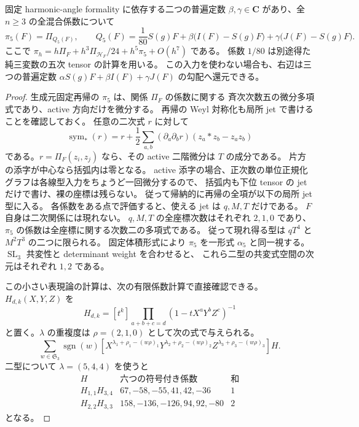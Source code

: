 \begin{proposition}[五次の混合項の二定数への還元]
\label{prop:nfm-mixed-fifth-reduction}
固定 harmonic-angle formality に依存する二つの普遍定数
$\beta,\gamma\in\mathbf C$ があり、全 $n\ge3$ の全混合係数について
\[
 \pi_5(F)=\Pi_{Q_5(F)},\qquad
 Q_5(F)=\frac1{80}S(g)F
       +\beta\bigl(I(F)-S(g)F\bigr)
       +\gamma\bigl(J(F)-S(g)F\bigr).
\]
ここで $\pi_h=h\Pi_F+h^3\Pi_{\mathscr H_F}/24+h^5\pi_5+O(h^7)$ である。
係数 $1/80$ は別途得た純三変数の五次 tensor の計算を用いる。
この入力を使わない場合も、右辺は三つの普遍定数
$\alpha S(g)F+\beta I(F)+\gamma J(F)$ の勾配へ還元できる。

\end{proposition}

\begin{proof}
生成元固定再帰の $\pi_5$ は、関係 $\Pi_F$ の係数に関する
斉次次数五の微分多項式であり、active 方向だけを微分する。
再帰の Weyl 対称化も局所 jet で書けることを確認しておく。
任意の二次式 $r$ に対して
\[
 \operatorname{sym}_*(r)=r+\frac12\sum_{a,b}
      (\partial_a\partial_b r)(z_a*z_b-z_az_b)
\]
である。$r=\Pi_F(z_i,z_j)$ なら、その active 二階微分は $T$ の成分である。
片方の添字が中心なら括弧内は零となる。
active 添字の場合、正次数の単位正規化グラフは各線型入力をちょうど一回微分するので、
括弧内も下位 tensor の jet だけで書け、裸の座標は残らない。
従って帰納的に再帰の全項が以下の局所 jet 型に入る。
各係数をある点で評価すると、使える jet は $q,M,T$ だけである。
$F$ 自身は二次関係には現れない。
$q,M,T$ の全座標次数はそれぞれ $2,1,0$ であり、
$\pi_5$ の係数は全座標に関する次数二の多項式である。
従って現れ得る型は $qT^4$ と $M^2T^3$ の二つに限られる。
固定体積形式により $\pi_5$ を一形式 $\alpha_5$ と同一視する。
$\operatorname{SL}_3$ 共変性と determinant weight を合わせると、
これら二型の共変式空間の次元はそれぞれ $1,2$ である。

この小さい表現論の計算は、次の有限係数計算で直接確認できる。
$H_{d,k}(X,Y,Z)$ を
\[
 H_{d,k}=[t^k]\prod_{a+b+c=d}(1-tX^aY^bZ^c)^{-1}
\]
と置く。$\lambda$ の重複度は
$\rho=(2,1,0)$ として次の式で与えられる。
\[
 \sum_{w\in\mathfrak S_3}\operatorname{sgn}(w)
 [X^{\lambda_1+\rho_1-(w\rho)_1}
  Y^{\lambda_2+\rho_2-(w\rho)_2}
  Z^{\lambda_3+\rho_3-(w\rho)_3}]H.
\]
二型について $\lambda=(5,4,4)$ を使うと
\[
\begin{array}{c|c|c}
H&\text{六つの符号付き係数}&\text{和}\\\hline
H_{1,1}H_{3,4}&67,-58,-55,41,42,-36&1\\
H_{2,2}H_{3,3}&158,-136,-126,94,92,-80&2
\end{array}
\]
となる。


\end{proof}
